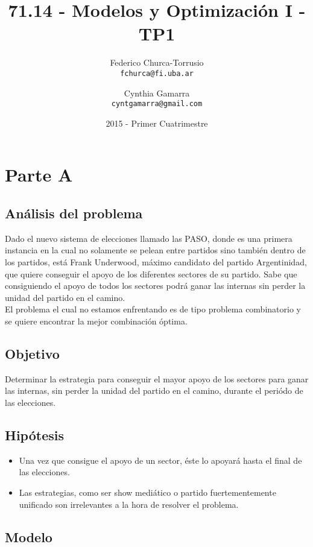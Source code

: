 \documentclass[10pt, a4paper, titlepage,
	oneside,
	fleqn, leqno]{article}
\title{71.14 - Modelos y Optimización I - TP1}
\author{
	Federico Churca-Torrusio \\\texttt{fchurca@fi.uba.ar}
	\and
	Cynthia Gamarra \\\texttt{cyntgamarra@gmail.com}}
\date{2015 - Primer Cuatrimestre}
\let\oldsection\section
\def\section{\cleardoublepage\oldsection}
\begin{document}
\maketitle
\thispagestyle{empty}
\cleardoublepage

\setcounter{page}{1}

\section{Parte A}

\subsection{Análisis del problema}
Dado el nuevo sistema de elecciones llamado las PASO, donde es una primera instancia en la cual no solamente se pelean entre partidos sino también dentro de los partidos, está Frank Underwood, máximo candidato del partido Argentinidad, que quiere conseguir el apoyo de los diferentes sectores de su partido. Sabe que consiguiendo el apoyo de todos los sectores podrá ganar las internas sin perder la unidad del partido en el camino.\\
El problema el cual no estamos enfrentando es de tipo problema combinatorio y se quiere encontrar la mejor combinación óptima.
\subsection{Objetivo}
Determinar la estrategia para conseguir el mayor apoyo de los sectores para ganar las internas, sin perder la unidad del partido en el camino, durante el periódo de las elecciones.

\subsection{Hipótesis}
\begin{itemize}
 \item Una vez que consigue el apoyo de un sector, éste lo apoyará hasta el final de las elecciones.
 \item Las estrategias, como ser show mediático o partido fuertementemente unificado son irrelevantes a la hora de resolver el problema.
\end{itemize}
\subsection{Modelo}
\end{document}
